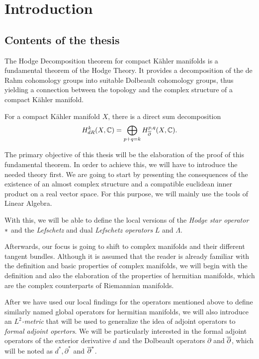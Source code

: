 \section{Introduction}
\stoptocentries  %
\subsection*{Contents of the thesis}\;

The Hodge Decomposition theorem for compact Kähler manifolds is a fundamental theorem of the Hodge
Theory. It provides a decomposition of the de Rahm cohomology groups into suitable Dolbeault
cohomology groups, thus yielding a connection between the topology and the complex structure of a
compact Kähler manifold.
\begin{thm}
	For a compact Kähler manifold $X$, there is a direct sum decomposition
	\begin{align*}
		H^k_{dR}(X,\mathbb{C}) = \bigoplus_{p+q=k} H^{p,q}_{{\overline{\partial}}}(X,\mathbb{C}).
	\end{align*}
\end{thm}
The primary objective of this thesis will be the elaboration of the proof of this fundamental
theorem. In order to achieve this, we will have to introduce the needed theory first. We are going
to start by presenting the consequences of the existence of an almost complex structure and a
compatible euclidean inner product on a real vector space. For this purpose, we will mainly use the
tools of Linear Algebra.

With this, we will be able to define the local versions of the \emph{Hodge star operator}
$\operatorname{\ast}$ and the \emph{Lefschetz} and dual \emph{Lefschetz operators} $L$ and $\Lambda$.

Afterwards, our focus is going to shift to complex manifolds and their different tangent bundles.
Although it is assumed that the reader is already familiar with the definition and basic properties
of complex manifolds, we will begin with the definition and also the elaboration of the properties
of hermitian manifolds, which are the complex counterparts of Riemannian manifolds.

After we have used our local findings for the operators mentioned above to define similarly named
global operators for hermitian manifolds, we will also introduce an \emph{$L^2$-metric} that will be
used to generalize the idea of adjoint operators to \emph{formal adjoint opertors}. We will be
particularly interested in the formal adjoint operators of the exterior derivative $d$ and the
Dolbeault operators $\partial$ and ${\overline{\partial}}$, which will be noted as $d^*,\partial^*$ and
${\overline{\partial}}^*$. 

